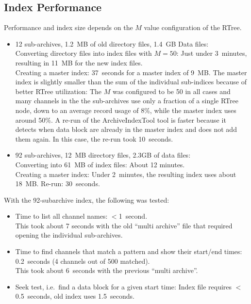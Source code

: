 \subsection{Index Performance}
Performance and index size depends on the $M$ value configuration of
the RTree.
\begin{itemize}
\item 12 sub-archives, 1.2~MB of old directory files, 1.4~GB Data
      files:\\
      Converting directory files into index files with $M=50$:
      Just under 3~minutes, resulting in 11~MB for the new index files.\\
      Creating a master index: 37~seconds for a master index of 9~MB.
      The master index is slightly smaller than the sum of the
      individual sub-indices because of better RTree utilization:
      The $M$ was configured to be 50 in all cases and many channels
      in the the sub-archives use only a fraction of a single RTree
      node, down to an average record usage of 8\%, while the master
      index uses around 50\%.
      A re-run of the ArchiveIndexTool tool is faster because
      it detects when data block are already in the master index and
      does not add them again. In this case, the re-run took 10~seconds.
\item 92 sub-archives, 12~MB directory files, 2.3GB of data files:\\
      Converting into 61~MB of index files: About 12 minutes.\\
      Creating a master index: Under 2~minutes, the resulting
      index uses about 18~MB.
      Re-run: 30~seconds.
\end{itemize}

\noindent With the 92-subarchive index, the following was tested:
\begin{itemize}
\item Time to list all channel names: $<$1~second.\\
      This took about 7 seconds with the old ``multi archive'' file
      that required opening the individual sub-archives.
\item Time to find channels that match a pattern and show their
      start/end times: 0.2~seconds (4 channels out of 500 matched).\\
      This took about 6~seconds with the previous ``multi archive''.
\item Seek test, i.e.\ find a data block for a given start time:
      Index file requires $<$0.5~seconds, old index uses 1.5~seconds.
\end{itemize}

